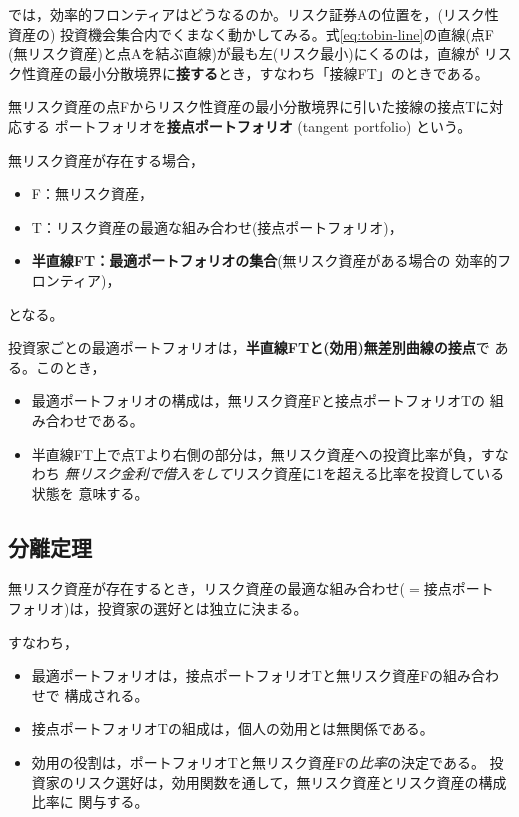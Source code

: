 では，効率的フロンティアはどうなるのか。リスク証券Aの位置を，(リスク性資産の)
投資機会集合内でくまなく動かしてみる。式\eqref{eq:tobin-line}の直線(点F
(無リスク資産)と点Aを結ぶ直線)が最も左(リスク最小)にくるのは，直線が
リスク性資産の最小分散境界に\textbf{接する}とき，すなわち「接線FT」のときである。

\begin{definition}[接点ポートフォリオ]
無リスク資産の点Fからリスク性資産の最小分散境界に引いた接線の接点Tに対応する
ポートフォリオを\textbf{接点ポートフォリオ} (tangent portfolio) という。
\end{definition}

\begin{keypoint}
無リスク資産が存在する場合，
\begin{itemize}
\item F：無リスク資産，
\item T：リスク資産の最適な組み合わせ(接点ポートフォリオ)，
\item \textbf{半直線FT：最適ポートフォリオの集合}(無リスク資産がある場合の
効率的フロンティア)，
\end{itemize}
となる。
\end{keypoint}

投資家ごとの最適ポートフォリオは，\textbf{半直線FTと(効用)無差別曲線の接点}で
ある。このとき，
\begin{itemize}
\item 最適ポートフォリオの構成は，無リスク資産Fと接点ポートフォリオTの
組み合わせである。
\item 半直線FT上で点Tより右側の部分は，無リスク資産への投資比率が負，すなわち
\emph{無リスク金利で借入をして}リスク資産に1を超える比率を投資している状態を
意味する。
\end{itemize}

\subsection{分離定理}

\begin{theorem}
無リスク資産が存在するとき，リスク資産の最適な組み合わせ($=$接点ポート
フォリオ)は，投資家の選好とは独立に決まる。
\end{theorem}

すなわち，
\begin{itemize}
\item 最適ポートフォリオは，接点ポートフォリオTと無リスク資産Fの組み合わせで
構成される。
\item 接点ポートフォリオTの組成は，個人の効用とは無関係である。
\item 効用の役割は，ポートフォリオTと無リスク資産Fの\emph{比率}の決定である。
投資家のリスク選好は，効用関数を通して，無リスク資産とリスク資産の構成比率に
関与する。
\end{itemize}

